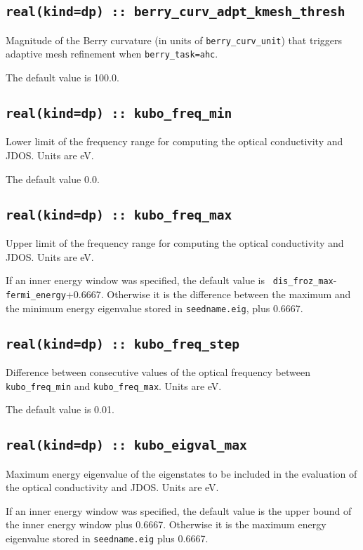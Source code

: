 \subsection[berry\_adpt\_kmesh\_thresh]{\tt real(kind=dp) ::
  berry\_curv\_adpt\_kmesh\_thresh}

Magnitude of the Berry curvature (in units of {\tt berry\_curv\_unit})
that triggers adaptive mesh refinement when {\tt berry\_task=ahc}.

The default value is 100.0.


\subsection[optics\_energy\_min]{\tt real(kind=dp) :: kubo\_freq\_min}
Lower limit of the frequency range for computing the optical conductivity
and JDOS. Units are eV.

The default value 0.0.

\subsection[optics\_energy\_max]{\tt real(kind=dp) :: kubo\_freq\_max}
Upper limit of the frequency range for computing the optical conductivity
and JDOS. Units are eV.

If an inner energy window was specified, the default value is {\tt
  dis\_froz\_max}-{\tt fermi\_energy}+0.6667.  Otherwise it is the
difference between the maximum and the minimum energy eigenvalue
stored in {\tt seedname.eig}, plus 0.6667.


\subsection[optics\_energy\_step]{\tt real(kind=dp) :: kubo\_freq\_step}
Difference between consecutive values of the optical frequency
between {\tt kubo\_freq\_min} and {\tt kubo\_freq\_max}. Units are eV.

The default value is 0.01.


\subsection[optics\_energy\_max]{\tt real(kind=dp) ::
  kubo\_eigval\_max}
Maximum energy eigenvalue of the eigenstates to be included in the
evaluation of the optical conductivity and JDOS.  Units are eV.

If an inner energy window was specified, the default value is the
upper bound of the inner energy window plus 0.6667.  Otherwise it is
the maximum energy eigenvalue stored in {\tt seedname.eig} plus
0.6667.

